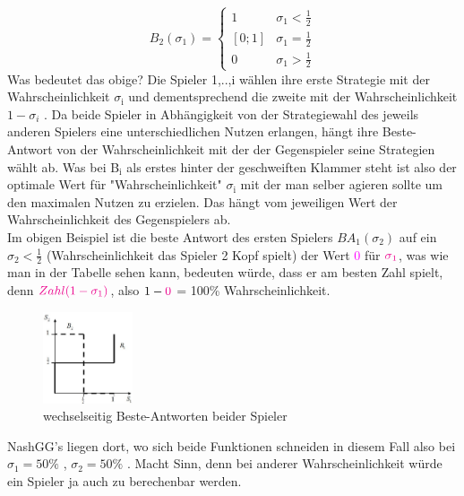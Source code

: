 \documentclass[11pt]{article}
\begin{document}
\[ B_2(\sigma_1) =\begin{cases} 
      1 & \sigma_1 < \frac{1}{2} \\
      [0;1] & \sigma_1 = \frac{1}{2} \\
      0 & \sigma_1 > \frac{1}{2} 
   \end{cases}
\]
Was bedeutet das obige? Die Spieler 1,..,i wählen ihre erste Strategie mit der Wahrscheinlichkeit \(\sigma_{\text{i}}\) und dementsprechend die zweite mit der Wahrscheinlichkeit \(1 - \sigma_i\) . Da beide Spieler in Abhängigkeit von der Strategiewahl des jeweils anderen Spielers eine unterschiedlichen Nutzen erlangen, hängt ihre Beste-Antwort von der Wahrscheinlichkeit mit der der Gegenspieler seine Strategien wählt ab. Was bei B\(_{\text{i}}\) als erstes hinter der geschweiften Klammer steht ist also der optimale Wert für "Wahrscheinlichkeit" \(\sigma_{\text{i}}\) mit der man selber agieren sollte um den maximalen Nutzen zu erzielen. Das hängt vom jeweiligen Wert der Wahrscheinlichkeit des Gegenspielers ab.\\
Im obigen Beispiel ist die beste Antwort des ersten Spielers \(BA_1(\sigma_2)\) auf ein \(\sigma_2 < \frac{1}{2}\) (Wahrscheinlichkeit das Spieler 2 Kopf spielt) der Wert \textcolor{magenta}{0} für \(\textcolor{magenta}{\sigma_1}\), was wie man in der Tabelle sehen kann, bedeuten würde, dass er am besten Zahl spielt, denn \(\textcolor{magenta}{Zahl(1-\sigma_1)}\), also \(1-\textcolor{magenta}{0}\) = 100\% Wahrscheinlichkeit.
\begin{figure}[htbp]
\centering
\includegraphics[width=100px]{./Kop_Zahl_BA2.png}
\caption{wechselseitig Beste-Antworten beider Spieler}
\end{figure}
\newline
NashGG's liegen dort, wo sich beide Funktionen schneiden in diesem Fall also bei \(\sigma_1=50\%\) , \(\sigma_2=50\%\) . Macht Sinn, denn bei anderer Wahrscheinlichkeit würde ein Spieler ja auch zu berechenbar werden. 
\end{document}
